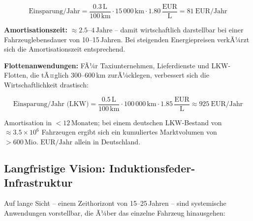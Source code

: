 ﻿\documentclass[12pt, a4paper]{report}
\theoremstyle{definition}
\theoremstyle{remark}
\begin{document}
\begin{equation}
  \text{Einsparung/Jahr} = \frac{0.3\,\text{L}}{100\,\text{km}} \cdot 15\,000\,\text{km}
  \cdot 1.80\,\frac{\text{EUR}}{\text{L}} = \SI{81}{\text{EUR/Jahr}}
  \label{eq:einsparung}
\end{equation}

\textbf{Amortisationszeit:} $\approx 2.5$--$4\,\text{Jahre}$ -- damit wirtschaftlich
darstellbar bei einer Fahrzeuglebensdauer von 10--15\,Jahren. Bei steigenden
Energiepreisen verkÃ¼rzt sich die Amortisationszeit entsprechend.

\textbf{Flottenanwendungen:} FÃ¼r Taxiunternehmen, Lieferdienste und
LKW-Flotten, die tÃ¤glich 300--600\,km zurÃ¼cklegen, verbessert sich die
Wirtschaftlichkeit drastisch:

\begin{equation}
  \text{Einsparung/Jahr (LKW)} = \frac{0.5\,\text{L}}{100\,\text{km}} \cdot 100\,000\,\text{km}
  \cdot 1.85\,\frac{\text{EUR}}{\text{L}} \approx \SI{925}{\text{EUR/Jahr}}
  \label{eq:einsparung_lkw}
\end{equation}

Amortisation in $< 12\,\text{Monaten}$; bei einem deutschen LKW-Bestand von
$\approx 3.5 \times 10^6$ Fahrzeugen ergibt sich ein kumuliertes
Marktvolumen von $> 600\,\text{Mio.\ EUR/Jahr}$ allein in Deutschland.

\subsection{Langfristige Vision: Induktionsfeder-Infrastruktur}
\label{ssec:ausblick_vision}

Auf lange Sicht -- einem Zeithorizont von 15--25\,Jahren -- sind
systemische Anwendungen vorstellbar, die Ã¼ber das einzelne Fahrzeug hinausgehen:
\end{document}
